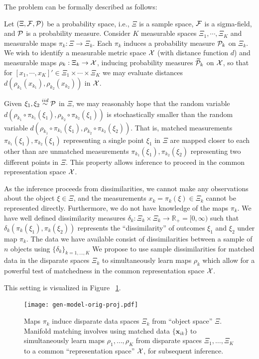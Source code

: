 \documentclass[12pt,oneside,final]{thesis}\usepackage[]{graphicx}\usepackage[]{color}
\begin{document}
 
The problem can be formally described as follows:


Let $(\Xi,\mathcal{F},\mathcal{P})$ be a probability space,
i.e., $\Xi$ is a sample space, $\mathcal{F}$ is a sigma-field,
and $\mathcal{P}$ is a probability measure.
Consider $K$ measurable spaces $\Xi_1,\cdots,\Xi_K$ 
and measurable maps $\pi_k:\Xi \to \Xi_k$.
Each $\pi_k$ induces a probability measure $\mathcal{P}_k$ on $\Xi_k$.
We wish to identify a measurable metric space $\mathcal{X}$
(with distance function $d$)
and measurable maps $\rho_k: \Xi_k \to \mathcal{X}$,
inducing probability measures $\widetilde{\mathcal{P}}_k$ on $\mathcal{X}$,
so that for $[x_1,\cdots,x_K]' \in \Xi_1 \times \cdots \times \Xi_K$
we may evaluate distances $d(\rho_{k_1}(x_{k_1}),\rho_{k_2}(x_{k_2}))$ in $\mathcal{X}$.


Given $\xi_1,\xi_2 \stackrel{iid}{\sim} \mathcal{P}$ in $\Xi$,
we may reasonably hope that the random variable
$d(\rho_{k_1}\circ\pi_{k_1}(\xi_1),\rho_{k_2}\circ\pi_{k_2}(\xi_1))$
is stochastically smaller than the random variable
$d(\rho_{k_1}\circ\pi_{k_1}(\xi_1),\rho_{k_2}\circ\pi_{k_2}(\xi_2))$.
That is, matched measurements 
$\pi_{k_1}(\xi_1),\pi_{k_2}(\xi_1)$
representing a single point $\xi_1$ in $\Xi$
are mapped closer to each other than are
unmatched measurements 
$\pi_{k_1}(\xi_1),\pi_{k_2}(\xi_2)$
representing two different points in $\Xi$.
This property allows inference to proceed in the common representation space $\mathcal{X}$.


As the inference proceeds from dissimilarities, we cannot make any observations about the object
 $\xi \in \Xi$,  and the measurements $x_k = \pi_k(\xi) \in \Xi_k$ cannot be represented directly. Furthermore, we do not have knowledge of the maps $\pi_k$.
 We have well defined dissimilarity measures
$\delta_k:\Xi_k \times \Xi_k \to \mathbb{R}_+ = [0,\infty)$
such that $\delta_k( \pi_k(\xi_1) , \pi_k(\xi_2) )$
represents the ``dissimilarity'' of outcomes $\xi_1$ and $\xi_2$
under map $\pi_k$.
The data we have  available consist of dissimilarities between a sample of $n$ objects using $\{\delta_k\}_{k=1,\ldots,K}$
We propose to use sample dissimilarities for matched data in the disparate spaces $\Xi_k$
to simultaneously learn maps $\rho_k$ which allow for a powerful test of matchedness
in the common representation space $\mathcal{X}$.

 This setting is visualized in  Figure ~\ref{fig:multisensor}.

\begin{figure}
  \begin{center}
\texttt{[image: gen-model-orig-proj.pdf]}
 \caption{Maps $\pi_k$ induce disparate data spaces $\Xi_k$ from ``object space'' $\Xi$.
    Manifold matching involves using matched data $\{\bm{x}_{ik}\}$
    to simultaneously learn maps $\rho_1,\ldots,\rho_K$
    from disparate spaces 
    $\Xi_1,\ldots,\Xi_K$
  to a common ``representation space'' $\mathcal{X}$, for subsequent inference.\label{fig:multisensor}}
  \end{center}
  
\end{figure}
\end{document}
